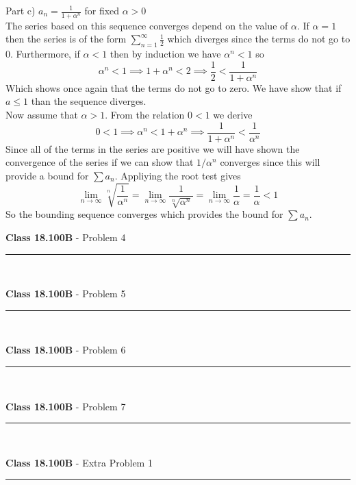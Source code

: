 \documentclass[11pt,reqno]{article}
\begin{document}
Part c) $a_n = \frac{1}{1+\alpha^n}$ for fixed $\alpha > 0$\\
The series based on this sequence converges depend on the value of $\alpha$. If $\alpha = 1$ then the series is of the form $\sum_{n = 1}^\infty \frac{1}{2}$ which diverges since the terms do not go to 0. Furthermore, if $\alpha < 1$ then by induction we have $\alpha^n < 1$ so 
\[ \alpha^n < 1 \implies 1+ \alpha^n < 2 \implies \frac{1}{2} < \frac{1}{1+\alpha^n} \]
Which shows once again that the terms do not go to zero. We have show that if $a \le 1$ than the sequence diverges. \\
\indent Now assume that $\alpha > 1$. From the relation $0 < 1$ we derive \[ 0 < 1 \implies \alpha^n < 1+ \alpha^n \implies \frac{1}{1+\alpha^n} < \frac{1}{\alpha^n} \]
Since all of the terms in the series are positive we will have shown the convergence of the series if we can show that $1/ \alpha^n$ converges since this will provide a bound for $\sum a_n$. Appliying the root test gives
\[ \lim_{n \to \infty} \sqrt[n]{\frac{1}{\alpha^n}} = \lim_{n \to \infty} \frac{1}{ \sqrt[n]{\alpha^n} } =  \lim_{n \to \infty} \frac{1}{\alpha} =  \frac{1}{\alpha} < 1 \]
So the bounding sequence converges which provides the bound for $\sum a_n$.



\vspace{15pt}
\begin{flushleft} 
\textbf{Class 18.100B} - Problem 4\\
\rule{500pt}{1pt}\\
\end{flushleft} 



\vspace{15pt}
\begin{flushleft} 
\textbf{Class 18.100B} - Problem 5\\
\rule{500pt}{1pt}\\
\end{flushleft} 


\vspace{15pt}
\begin{flushleft} 
\textbf{Class 18.100B} - Problem 6\\
\rule{500pt}{1pt}\\
\end{flushleft} 


\vspace{15pt}
\begin{flushleft} 
\textbf{Class 18.100B} - Problem 7\\
\rule{500pt}{1pt}\\
\end{flushleft} 


\indent 
\vspace{15pt}
\begin{flushleft} 
\textbf{Class 18.100B} - Extra Problem 1\\
\rule{500pt}{1pt}\\
\end{flushleft} 
\end{document}
